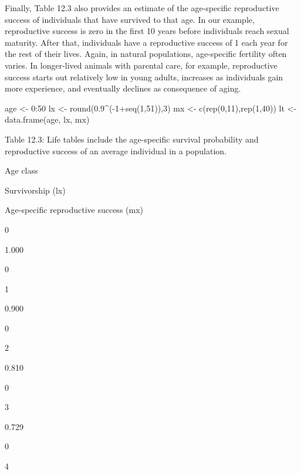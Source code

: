 \documentclass[
]{book}
\newenvironment{Shaded}{\begin{snugshade}}{\end{snugshade}}
\newcommand{\DecValTok}[1]{\textcolor[rgb]{0.00,0.00,0.81}{#1}}
\newcommand{\FloatTok}[1]{\textcolor[rgb]{0.00,0.00,0.81}{#1}}
\newcommand{\FunctionTok}[1]{\textcolor[rgb]{0.00,0.00,0.00}{#1}}
\newcommand{\NormalTok}[1]{#1}
\newcommand{\OtherTok}[1]{\textcolor[rgb]{0.56,0.35,0.01}{#1}}
\newcommand{\SpecialCharTok}[1]{\textcolor[rgb]{0.00,0.00,0.00}{#1}}
\begin{document}
Finally, Table 12.3 also provides an estimate of the age-specific reproductive success of individuals that have survived to that age. In our example, reproductive success is zero in the first 10 years before individuals reach sexual maturity. After that, individuals have a reproductive success of 1 each year for the rest of their lives. Again, in natural populations, age-specific fertility often varies. In longer-lived animals with parental care, for example, reproductive success starts out relatively low in young adults, increases as individuals gain more experience, and eventually declines as consequence of aging.

\begin{Shaded}
\begin{Highlighting}[]
\NormalTok{age }\OtherTok{\textless{}{-}} \DecValTok{0}\SpecialCharTok{:}\DecValTok{50}
\NormalTok{lx }\OtherTok{\textless{}{-}} \FunctionTok{round}\NormalTok{(}\FloatTok{0.9}\SpecialCharTok{\^{}}\NormalTok{(}\SpecialCharTok{{-}}\DecValTok{1}\SpecialCharTok{+}\FunctionTok{seq}\NormalTok{(}\DecValTok{1}\NormalTok{,}\DecValTok{51}\NormalTok{)),}\DecValTok{3}\NormalTok{)}
\NormalTok{mx }\OtherTok{\textless{}{-}} \FunctionTok{c}\NormalTok{(}\FunctionTok{rep}\NormalTok{(}\DecValTok{0}\NormalTok{,}\DecValTok{11}\NormalTok{),}\FunctionTok{rep}\NormalTok{(}\DecValTok{1}\NormalTok{,}\DecValTok{40}\NormalTok{))}
\NormalTok{lt }\OtherTok{\textless{}{-}} \FunctionTok{data.frame}\NormalTok{(age, lx, mx)}
\end{Highlighting}
\end{Shaded}

\label{tab:unnamed-chunk-35}Table 12.3: Life tables include the age-specific survival probability and reproductive success of an average individual in a population.

Age class

Survivorship (lx)

Age-specific reproductive success (mx)

0

1.000

0

1

0.900

0

2

0.810

0

3

0.729

0

4
\end{document}
